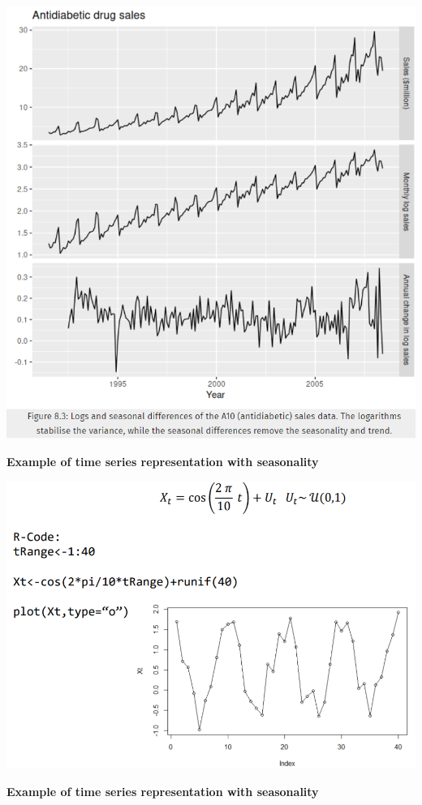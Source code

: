 \documentclass[
]{article}
\begin{document}
\includegraphics[width=1\linewidth]{drug}

\textbf{Example of time series representation with seasonality}

\includegraphics[width=1\linewidth]{cos}

\textbf{Example of time series representation with seasonality}
\end{document}
